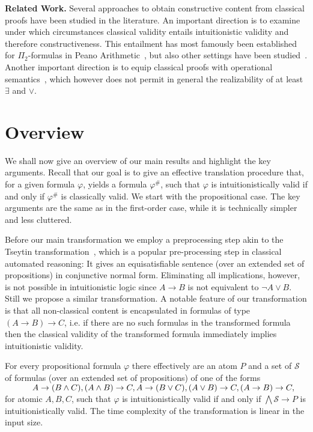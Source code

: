 \documentclass[a4paper,UKenglish,cleveref, autoref, thm-restate]{lipics-v2021}
\begin{document}
\textbf{Related Work.}
Several approaches to obtain constructive content from classical proofs have been studied in the literature.
An important direction is to examine under which circumstances classical validity entails intuitionistic validity and therefore constructiveness.
This entailment has most famously been established for $\Pi_2$-formulas in Peano Arithmetic~\cite{friedman1978classically}, but also other settings have been studied~\cite{schwichtenberg}.
Another important direction is to equip classical proofs with operational semantics~\cite{Control1, Parigot1}, which however does not permit in general the realizability of at least $\exists$ and $\vee$.



\section{Overview}

We shall now give an overview of our main results and highlight the key arguments. Recall that our goal is to give an effective translation procedure that, for a given formula $\varphi$, yields a formula $\varphi^\#$, such that $\varphi$ is intuitionistically valid if and only if $\varphi^\#$ is classically valid. We start with the propositional case. The key arguments are the same as in the first-order case, while it is technically simpler and less cluttered.

Before our main transformation we employ a preprocessing step akin to the Tseytin transformation~\cite{tseitin1983complexity}, which is a popular pre-processing step in classical automated reasoning:
It gives an equisatisfiable sentence (over an extended set of propositions) in conjunctive normal form.
Eliminating all implications, however, is not possible in intuitionistic logic since $A\to B$ is not equivalent to $\neg A\vee B$.
Still we propose a similar transformation.
A notable feature of our transformation is that all non-classical content is encapsulated in formulas of type $(A\to B)\to C$, i.e. if there are no such formulas in the transformed formula then the classical validity of the transformed formula immediately implies intuitionistic validity.

\begin{theorem}\label{thm:Tseytin}
For every propositional formula $\varphi$ there effectively are an atom $P$ and a set of $\mathcal S$ of formulas (over an extended set of propositions) of one of the forms\\
$\text{ \hspace{1cm}} A\to (B\wedge C), (A\wedge B)\to C, A\to (B\vee C), (A\vee B)\to C, (A\to B)\to C,$\\
for atomic $A, B, C$, such that $\varphi$ is intuitionistically valid if and only if $\bigwedge\mathcal S\to P$ is intuitionistically valid. The time complexity of the transformation is linear in the input size.
\end{theorem}
\end{document}
